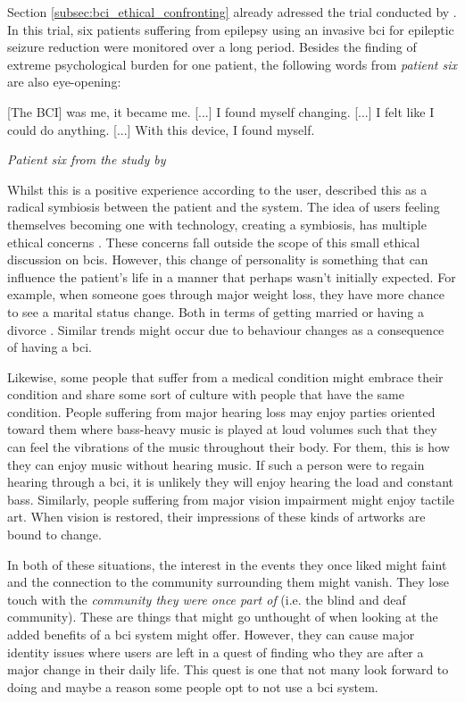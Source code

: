 Section \ref{subsec:bci_ethical_confronting} already adressed the trial conducted by \citet{first_bci_trial}.
In this trial, six patients suffering from epilepsy using an invasive \gls{bci} for epileptic seizure reduction were monitored over a long period.
Besides the finding of extreme psychological burden for one patient, the following words from \textit{patient six} are also eye-opening:

\setlength{\epigraphwidth}{0.9\textwidth}
\epigraph{[The BCI] was me, it became me. [...] I found myself changing. [...] I felt like I could do anything. [...] With this device, I found myself. }{\textit{Patient six from the study by \citet{first_bci_trial}}}

Whilst this is a positive experience according to the user, \citet{first_bci_trial} described this as a radical symbiosis between the patient and the system.
The idea of users feeling themselves becoming one with technology, creating a symbiosis, has multiple ethical concerns \citep{ethics_of_bci}.
These concerns fall outside the scope of this small ethical discussion on \glspl{bci}.
However, this change of personality is something that can influence the patient's life in a manner that perhaps wasn't initially expected.
For example, when someone goes through major weight loss, they have more chance to see a marital status change.
Both in terms of getting married or having a divorce \citep{weight_loss_divorce}.
Similar trends might occur due to behaviour changes as a consequence of having a \gls{bci}.

Likewise, some people that suffer from a medical condition might embrace their condition and share some sort of culture with people that have the same condition.
People suffering from major hearing loss may enjoy parties oriented toward them where bass-heavy music is played at loud volumes such that they can feel the vibrations of the music throughout their body.
For them, this is how they can enjoy music without hearing music.
If such a person were to regain hearing through a \gls{bci}, it is unlikely they will enjoy hearing the load and constant bass.
Similarly, people suffering from major vision impairment might enjoy tactile art.
When vision is restored, their impressions of these kinds of artworks are bound to change.

In both of these situations, the interest in the events they once liked might faint and the connection to the community surrounding them might vanish.
They lose touch with the \textit{community they were once part of} (i.e. the blind and deaf community).
These are things that might go unthought of when looking at the added benefits of a \gls{bci} system might offer.
However, they can cause major identity issues where users are left in a quest of finding who they are after a major change in their daily life.
This quest is one that not many look forward to doing and maybe a reason some people opt to not use a \gls{bci} system.


